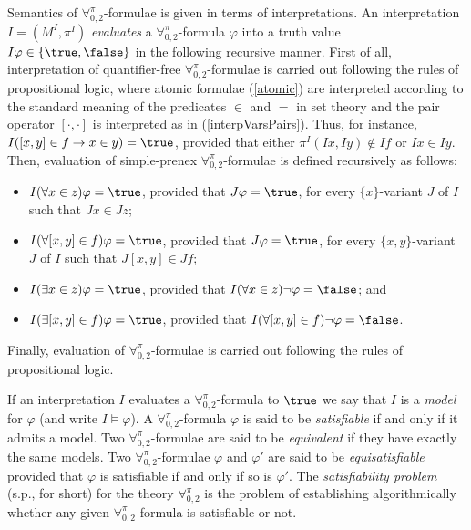 \documentclass[submission,copyright,creativecommons]{eptcs}
\newcommand{\Lang}{\ensuremath{\mathbf{\forall}^{\pi}_{0,2}}\xspace}
\newcommand{\assignment}[1]{M^{#1}}
\newcommand{\pairf}[1]{\pi^{#1}}
\newcommand{\inter}{I}
\newcommand{\ipairf}{\pairf{\inter}}
\newcommand{\iassignment}{\assignment{\inter}}
\newcommand{\interp}{J}
\newcommand{\vx}{x}
\newcommand{\vy}{y}
\newcommand{\svx}{x}
\newcommand{\svy}{y}
\newcommand{\svz}{z}
\newcommand{\mvx}{f}
\begin{document}
Semantics of \Lang-formulae is given in terms of interpretations.  An
interpretation $\inter=(\iassignment, \ipairf)$ \emph{evaluates} a
\Lang-formula $\varphi$ into a truth value $\inter \varphi \in
\{\true,\false\}$ in the following recursive manner.
First of all, interpretation of quantifier-free \Lang-formulae is
carried out following the rules of propositional logic, where atomic
formulae (\ref{atomic}) are interpreted according to the standard
meaning of the predicates $\in$ and $=$ in set theory and the pair
operator $[\cdot,\cdot]$ is interpreted as in (\ref{interpVarsPairs}).
Thus, for instance, $\inter ([\svx,\svy] \in \mvx \rightarrow x \in y
) = \true$, provided that either $\ipairf(\inter \vx, \inter \vy)
\notin \inter \mvx$ or $\inter \vx \in \inter \vy$.
Then, evaluation of simple-prenex \Lang-formulae is defined
recursively as follows:
\begin{itemize}
  \item $\inter (\forall \svx \in \svz)\varphi = \true$, provided that
  $\interp \varphi = \true$, for every $\{\svx\}$-variant $\interp$ of
  $\inter$ such that $\interp \svx \in \interp \svz$;
  
  \item $\inter (\forall [\svx,\svy] \in \mvx)\varphi = \true$,
  provided that $\interp \varphi = \true$, for every
  $\{\svx,\svy\}$-variant $\interp$ of $\inter$ such that $\interp
  [\svx,\svy] \in \interp \mvx$;  
  
  \item $\inter (\exists \svx \in \svz)\varphi = \true$, provided that
  $\inter (\forall \svx \in \svz)\neg \varphi =\false$; and 
  
  \item $\inter (\exists [\svx,\svy] \in \mvx)\varphi = \true$,
  provided that $\inter (\forall [\svx,\svy] \in \mvx) \neg \varphi = 
  \false$.
\end{itemize}
Finally, evaluation of \Lang-formulae is carried out following the
rules of propositional logic.  

If an interpretation $\inter$ evaluates a \Lang-formula to $\true$ we
say that $\inter$ is a \emph{model} for $\varphi$ (and write $\inter
\models \varphi$).  
A \Lang-formula $\varphi$ is said to be \emph{satisfiable} if and only
if it admits a model.  
Two \Lang-formulae are said to be
\emph{equivalent} if they have exactly the same models.
Two \Lang-formulae $\varphi$ and $\varphi'$ are
said to be \emph{equisatisfiable} provided that $\varphi$ is
satisfiable if and only if so is $\varphi'$.  
The \emph{satisfiability
problem} (s.p., for short) for the theory \Lang is the problem of
establishing algorithmically whether any given \Lang-formula is
satisfiable or not.
\end{document}
